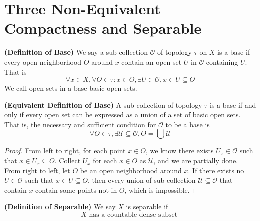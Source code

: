 \documentclass{report}
\begin{document}
\section{Three Non-Equivalent Compactness and Separable}
\begin{definition}
\label{2.3.1}
\textbf{(Definition of Base)} We say a sub-collection $\mathcal{O}$ of topology $\tau$ on $X$ is a base if every open neighborhood $O$ around $x$ contain an open set $U$ in $\mathcal{O}$ containing $U$. That is
\begin{equation}
\forall x\in X, \forall O\in\tau:x\in O,\exists U\in \mathcal{O}, x\in U\subseteq O
\end{equation}
We call open sets in a base basic open sets.
\end{definition}
\begin{theorem}
\label{2.3.2}
\textbf{(Equivalent Definition of Base)} A sub-collection of topology $\tau$ is a base if and only if every open set can be expressed as a union of a set of basic open sets. That is, the necessary and sufficient condition for $\mathcal{O}$ to be a base is 
\begin{equation}
\forall O\in \tau, \exists \mathcal{U}\subseteq \mathcal{O}, O=\bigcup \mathcal{U}
\end{equation}
\end{theorem}
\begin{proof}
  From left to right, for each point $x\in O$, we know there exists $U_x\in \mathcal{O}$ such that $x\in U_x\subseteq O$. Collect $U_x$ for each $x\in O$ as $\mathcal{U}$, and we are partially done.\\

  From right to left, let $O$ be an open neighborhood around $x$. If there exists no $U\in \mathcal{O}$ such that $x\in U\subseteq O$, then every union of sub-collection $\mathcal{U}\subseteq\mathcal{O}$ that contain $x$ contain some points not in  $O$, which is impossible.  
\end{proof}
\begin{definition}
\label{2.3.3}
\textbf{(Definition of Separable)} We say $X$ is separable if 
\begin{equation}
  X\text{ has a countable dense subset }
\end{equation}
\end{definition}
\end{document}
